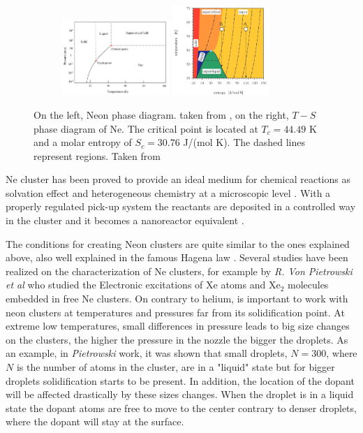 \begin{figure}[h!]
\centering
\begin{subfigure}[l]{1\textwidth}
\includegraphics[width=0.45\textwidth]{../Images/Ne_temp_phases.png} \hfill
\includegraphics[width=0.4\textwidth]{../Images/T-s ne phase diagran.png}
\end{subfigure}
\caption[Neon phase-Isentropic diagrams]{On the left, Neon phase diagram. taken from \cite{young_phase_nodate}, on the right, $T-S$ phase diagram of Ne. The critical point is located at $T_{c}= 44.49$ K and a molar entropy of $S_{c}=30.76$ J/(mol K). The dashed lines represent regions. Taken from \cite{christen_supersonic_2010-1} }
\label{fig:Nephases}
\end{figure}

Ne cluster has been proved to provide an ideal medium for chemical reactions as solvation effect and heterogeneous chemistry at a microscopic level \cite{gough_infrared_1985}. With a properly regulated pick-up system the reactants are deposited in a controlled way in the cluster and it becomes a nanoreactor equivalent \cite{gaveau_reaction_2001}.

The conditions for creating Neon clusters are quite similar to the ones explained above, also well explained in the famous Hagena law \cite{hagena_cluster_1972-1}. Several studies have been realized on the characterization of Ne clusters, for example  by \textit{R. Von Pietrowski et al}   \cite{von_pietrowski_fluorescence_1997} who studied the Electronic excitations of Xe atoms and Xe$_{2}$ molecules  embedded in free Ne clusters. On contrary to helium, is important to work with neon clusters at temperatures and pressures far from its solidification point. At extreme low temperatures, small differences in pressure leads to big size changes on the clusters, the higher the pressure in the nozzle the bigger the droplets. As an example, in \textit{Pietrowski} work, it was shown that small droplets, $N=300$, where $N$ is the number of atoms in the cluster, are in a "liquid" state but for bigger droplets solidification starts to be present. In addition, the location of the dopant will be affected drastically by these sizes changes. When the droplet is in a liquid state the dopant atoms are free to move to the center contrary to denser droplets, where the dopant will stay at the surface.



